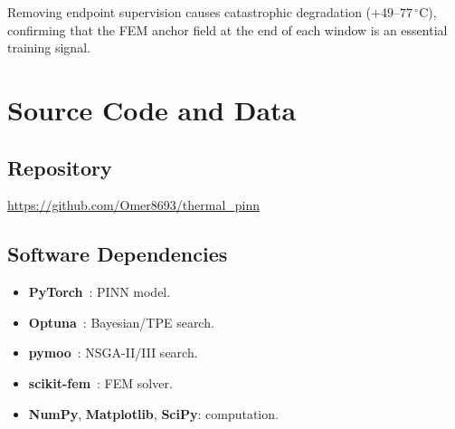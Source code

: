 Removing endpoint supervision causes catastrophic degradation
($+49$--$77\,^\circ\mathrm{C}$), confirming that the FEM anchor field at the
end of each window is an essential training signal.

\chapter{Source Code and Data}
\label{app:code}


\section*{Repository}

\begin{center}
\url{https://github.com/Omer8693/thermal_pinn}
\end{center}

\section*{Software Dependencies}

\begin{itemize}
  \item \textbf{PyTorch}~\cite{paszke2019pytorch}: PINN model.
  \item \textbf{Optuna}~\cite{akiba2019}: Bayesian/TPE search.
  \item \textbf{pymoo}~\cite{blank2020pymoo}: NSGA-II/III search.
  \item \textbf{scikit-fem}~\cite{gustafsson2020scikit}: FEM solver.
  \item \textbf{NumPy}, \textbf{Matplotlib}, \textbf{SciPy}: computation.
\end{itemize}
